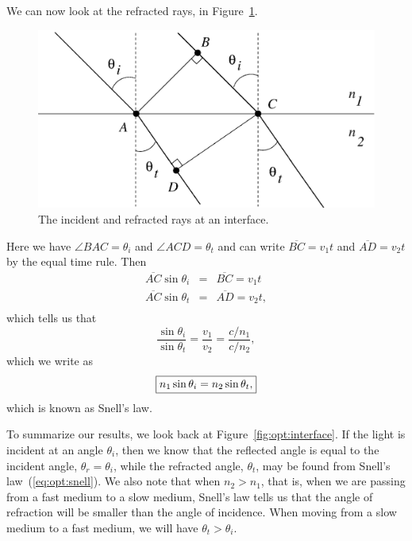 We can now look at the refracted rays, in Figure~\ref{fig:opt:refracted}.
\begin{figure}[htb]
\centering 
\epsfxsize=10cm \includegraphics[scale=0.6]{8_optics/refracted.eps}
\caption{The incident and refracted rays at an interface.}
\label{fig:opt:refracted}
\end{figure}
Here we have $\angle BAC =\theta_i$ and $\angle ACD =\theta_t$ and can write
$\overline{BC}=v_1 t$ and $\overline{AD}=v_2 t$ by the equal time rule. Then
\begin{eqnarray*}
\overline{AC}\sin\theta_i &=& \overline{BC}=v_1 t \nonumber \\
\overline{AC}\sin\theta_t &=& \overline{AD}=v_2 t, \\
\end{eqnarray*}
which tells us that
$$ \frac{\sin\theta_i}{\sin\theta_t} =\frac{v_1}{v_2} =\frac{c/n_1}{c/n_2}, $$
which we write as 
\begin{equation}
\fbox{$ \displaystyle n_1\sin\theta_i=n_2\sin\theta_t,$} \label{eq:opt:snell}
\end{equation}
which is known as Snell's law.   

To summarize our results, we look back at Figure~\ref{fig:opt:interface}.
If the light is incident at an angle $\theta_i$, then we know that the 
reflected angle is equal to the incident angle, $\theta_r=\theta_i$, while
the refracted angle, $\theta_t$, may be found from Snell's 
law~(\ref{eq:opt:snell}).  We also note that when $n_2>n_1$, that is, when we
are passing from a fast medium to a slow medium, Snell's law tells us that the 
angle of refraction will be smaller than the angle of incidence. When moving 
from a slow medium to a fast medium, we will have $\theta_t >\theta_i$.

